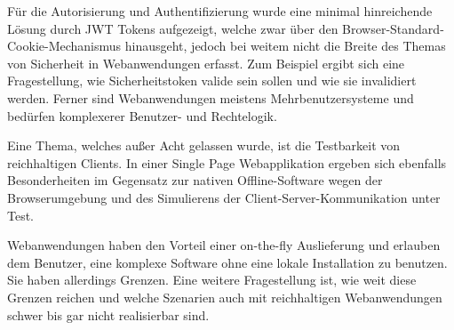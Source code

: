 Für die Autorisierung und Authentifizierung wurde eine minimal hinreichende Lösung durch JWT Tokens aufgezeigt, welche zwar über den Browser-Standard-Cookie-Mechanismus hinausgeht, jedoch bei weitem nicht die Breite des Themas von Sicherheit in Webanwendungen erfasst. Zum Beispiel ergibt sich eine Fragestellung, wie Sicherheitstoken valide sein sollen und wie sie invalidiert werden. Ferner sind Webanwendungen meistens Mehrbenutzersysteme und bedürfen komplexerer Benutzer- und Rechtelogik.

Eine Thema, welches außer Acht gelassen wurde, ist die Testbarkeit von reichhaltigen Clients. In einer Single Page Webapplikation ergeben sich ebenfalls Besonderheiten im Gegensatz zur nativen Offline-Software wegen der Browserumgebung und des Simulierens der Client-Server-Kommunikation unter Test.

Webanwendungen haben den Vorteil einer on-the-fly Auslieferung und erlauben dem Benutzer, eine komplexe Software ohne eine lokale Installation zu benutzen. Sie haben allerdings Grenzen. Eine weitere Fragestellung ist, wie weit diese Grenzen reichen und welche Szenarien auch mit reichhaltigen Webanwendungen schwer bis gar nicht realisierbar sind.
